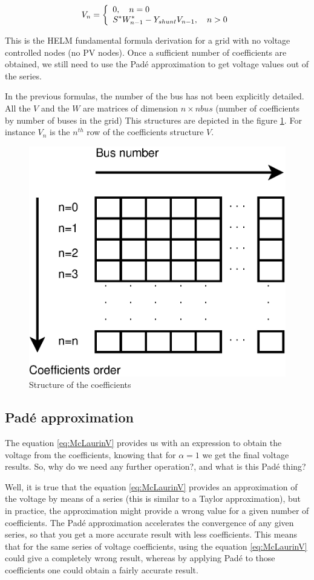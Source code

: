 \documentclass[nols,a4paper,twoside,notoc,fleqn]{tufte-book}
\begin{document}
\begin{equation}
{V}_n =
\left\{
\begin{array}{ll}
\mathlarger{0}, \quad n=0\\
\mathlarger{{S}^* {W}^*_{n-1} - Y_{shunt} {V}_{n-1} }, \quad n>0
\end{array}
\right.
\end{equation}

This is the HELM fundamental formula derivation for a grid with no voltage controlled nodes (no PV nodes). Once a sufficient number of coefficients are obtained, we still need to use the Pad\'e approximation to get voltage values out of the series.


In the previous formulas, the number of the bus has not been explicitly detailed. All the ${V}$ and the ${W}$ are matrices of dimension $n \times nbus$ (number of coefficients by number of buses in the grid) This structures are depicted in the figure \ref{fig:CoefficientsStructure}. For instance ${V}_n$ is the $n^{th}$ row of the coefficients structure ${V}$.


\begin{figure}[h]
	\centering
	\includegraphics[width=0.4\linewidth]{img/CoefficientsStructure.eps}
	\caption{Structure of the coefficients}
	\label{fig:CoefficientsStructure}
\end{figure}

\subsection{Pad\'e approximation}

The equation \ref{eq:McLaurinV} provides us with an expression to obtain the voltage from the coefficients, knowing that for $\alpha=1$ we get the final voltage results. So, why do we need any further operation?, and what is this Pad\'e thing?

Well, it is true that the equation \ref{eq:McLaurinV} provides an approximation of the voltage by means of a series (this is similar to a Taylor approximation), but in practice, the approximation might provide a wrong value for a given number of coefficients. The Pad\'e approximation accelerates the convergence of any given series, so that you get a more accurate result with less coefficients. This means that for the same series of voltage coefficients, using the equation \ref{eq:McLaurinV} could give a completely wrong result, whereas by applying Pad\'e to those coefficients one could obtain a fairly accurate result.
\end{document}
